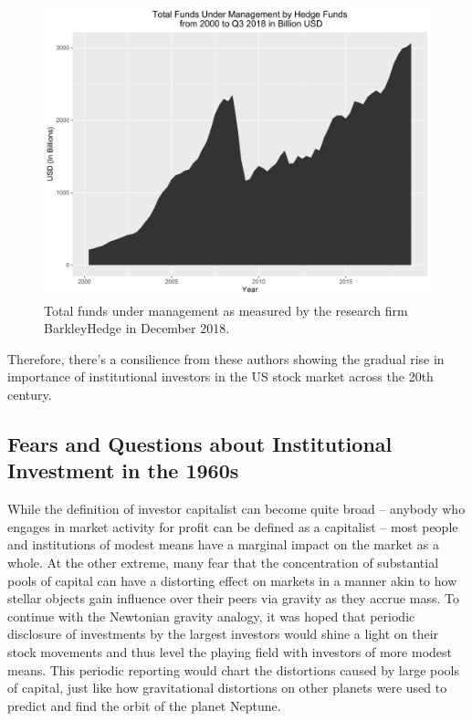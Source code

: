 \begin{figure}[ht]
	\centering
	\includegraphics[width=1\textwidth]{Figures/ChapterII/Hedge_Funds_Under_Management_Barkley_Hedge.pdf}
	\caption[Funds Under Management for Hedge Funds from 2000 to Q3 2018]{Total funds under management as measured by the research firm BarkleyHedge in December 2018.}
	\label{fig:hedgefundsundermanagementbarkleyhedge}
\end{figure}
	
\nocite{BarclayHedge2018}
	
Therefore, there's a consilience from these authors showing the gradual rise in importance of institutional investors in the US stock market across the 20th century.   
	
\subsection{Fears and Questions about Institutional Investment in the 1960s}
	
While the definition of investor capitalist can become quite broad -- anybody who engages in market activity for profit can be defined as a capitalist -- most people and institutions of modest means have a marginal impact on the market as a whole. At the other extreme, many fear that the concentration of substantial pools of capital can have a distorting effect on markets in a manner akin to how stellar objects gain influence over their peers via gravity as they accrue mass. To continue with the Newtonian gravity analogy, it was hoped that periodic disclosure of investments by the largest investors would shine a light on their stock movements and thus level the playing field with investors of more modest means. This periodic reporting would chart the distortions caused by large pools of capital, just like how gravitational distortions on other planets were used to predict and find the orbit of the planet Neptune. 
	
